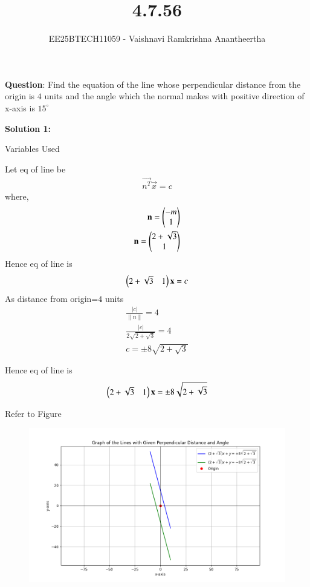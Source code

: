 \documentclass[journal]{IEEEtran}
\title{4.7.56}
\author{EE25BTECH11059 - Vaishnavi Ramkrishna Anantheertha}
\begin{document}
\maketitle

\renewcommand{\thefigure}{\theenumi}
\renewcommand{\thetable}{\theenumi}


\textbf{Question}:
Find the equation of the line whose perpendicular distance from the origin is $4$ units and the angle which the normal makes with positive direction of x-axis is $15^\circ$

\textbf{Solution 1: }
\begin{table}[H]    
  \centering
  
  \caption{Variables Used}
  \label{tab:4.7.56}
\end{table}

Let eq of line be
\begin{align}
\vec{n^T}\vec{x}=c
\end{align}
where,
\begin{align}
\mathbf{n}=\begin{pmatrix}-m
               \\
               1\end{pmatrix}\\
\mathbf{n}=\begin{pmatrix}2+\sqrt{3}
                \\
                1\end{pmatrix}
\end{align}
Hence eq of line is
\begin{align}
\begin{pmatrix}2+\sqrt{3}&1\end{pmatrix}
\mathbf{x}
=c\\
\end{align}
As distance from origin=$4$ units
\begin{align}
    \frac{|c|}{\|n\|}=4\\
    \frac{|c|}{2\sqrt{2+\sqrt{3}}}=4\\
    c=\pm 8\sqrt{2+\sqrt{3}}
\end{align}   


Hence eq of line is 
\begin{align}
 \begin{pmatrix}2+\sqrt{3}&1\end{pmatrix}
\mathbf{x}
= \pm 8 \sqrt{2 + \sqrt{3}}
\end{align}

Refer to Figure

\begin{figure}[H]
\begin{center}
\includegraphics[width=0.6\columnwidth]{figs/graph7.png}
\end{center}
\caption{}
\label{fig:Fig}
\end{figure}
\end{document}
